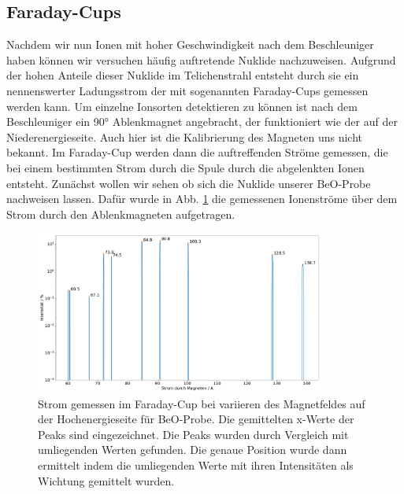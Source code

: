 \subsection{Faraday-Cups}
Nachdem wir nun Ionen mit hoher Geschwindigkeit nach dem Beschleuniger haben können wir versuchen häufig auftretende Nuklide nachzuweisen.
Aufgrund der hohen Anteile dieser Nuklide im Telichenstrahl entsteht durch sie ein nennenswerter Ladungsstrom der mit sogenannten Faraday-Cups gemessen werden kann.
Um einzelne Ionsorten detektieren zu können ist nach dem Beschleuniger ein \ang{90} Ablenkmagnet angebracht, der funktioniert wie der auf der Niederenergieseite.
Auch hier ist die Kalibrierung des Magneten uns nicht bekannt.
Im Faraday-Cup werden dann die auftreffenden Ströme gemessen, die bei einem bestimmten Strom durch die Spule durch die abgelenkten Ionen entsteht.
Zunächst wollen wir sehen ob sich die Nuklide unserer BeO-Probe nachweisen lassen.
Dafür wurde in Abb. \ref{Auswertung_Bild_Faraday_Cup_BeO_HE} die gemessenen Ionenströme über dem Strom durch den Ablenkmagneten aufgetragen.
\begin{figure}[ht]
	\centering
           \includegraphics[width=0.85\textwidth]{Pictures/Faraday_Cup_BeO_HE.pdf}
	\caption{Strom gemessen im Faraday-Cup bei variieren des Magnetfeldes auf der Hochenergieseite für BeO-Probe. Die gemittelten x-Werte der Peaks sind eingezeichnet. Die Peaks wurden durch Vergleich mit umliegenden Werten gefunden. Die genaue Position wurde dann ermittelt indem die umliegenden Werte mit ihren Intensitäten als Wichtung gemittelt wurden.}
	\label{Auswertung_Bild_Faraday_Cup_BeO_HE}
\end{figure}

